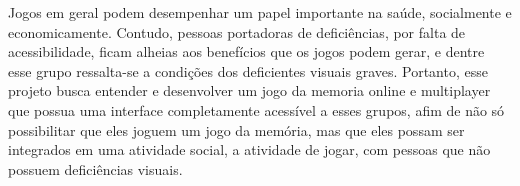 Jogos em geral podem desempenhar um papel importante na saúde, socialmente e economicamente. Contudo, pessoas portadoras de deficiências, por falta de acessibilidade, ficam alheias aos benefícios que os jogos podem gerar, e dentre esse grupo ressalta-se a condições dos deficientes visuais graves. Portanto, esse projeto busca entender e desenvolver um jogo da memoria online e multiplayer que possua uma interface completamente acessível a esses grupos, afim de não só possibilitar que eles joguem um jogo da memória, mas que eles possam ser integrados em uma atividade social, a atividade de jogar, com pessoas que não possuem deficiências visuais.  

